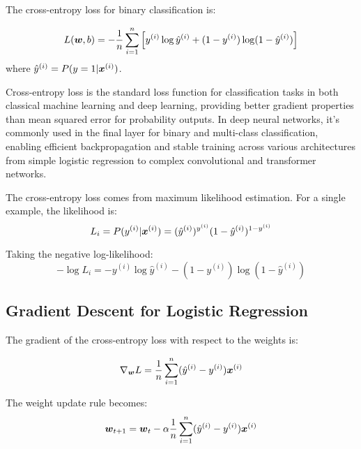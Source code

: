 \begin{definition}
The cross-entropy loss for binary classification is:

\begin{equation}
L(\boldsymbol{w}, b) = -\frac{1}{n} \sum_{i=1}^{n} \left[y^{(i)} \log \hat{y}^{(i)} + (1-y^{(i)}) \log(1-\hat{y}^{(i)})\right]
\end{equation}
where $\hat{y}^{(i)} = P(y=1|\boldsymbol{x}^{(i)})$.
\end{definition}

\begin{remark}
Cross-entropy loss is the standard loss function for classification tasks in both classical machine learning and deep learning, providing better gradient properties than mean squared error for probability outputs. In deep neural networks, it's commonly used in the final layer for binary and multi-class classification, enabling efficient backpropagation and stable training across various architectures from simple logistic regression to complex convolutional and transformer networks.
\end{remark}

\begin{definition}
The cross-entropy loss comes from maximum likelihood estimation. For a single example, the likelihood is:
$$L_i = P(y^{(i)}|\boldsymbol{x}^{(i)}) = (\hat{y}^{(i)})^{y^{(i)}} (1-\hat{y}^{(i)})^{1-y^{(i)}}$$

Taking the negative log-likelihood:
$$-\log L_i = -y^{(i)} \log \hat{y}^{(i)} - (1-y^{(i)}) \log(1-\hat{y}^{(i)})$$
\end{definition}

\subsection{Gradient Descent for Logistic Regression}

The gradient of the cross-entropy loss with respect to the weights is:

\begin{equation}
\nabla_{\boldsymbol{w}} L = \frac{1}{n} \sum_{i=1}^{n} (\hat{y}^{(i)} - y^{(i)}) \boldsymbol{x}^{(i)}
\end{equation}

The weight update rule becomes:
\begin{equation}
\boldsymbol{w}_{t+1} = \boldsymbol{w}_t - \alpha \frac{1}{n} \sum_{i=1}^{n} (\hat{y}^{(i)} - y^{(i)}) \boldsymbol{x}^{(i)}
\end{equation}

